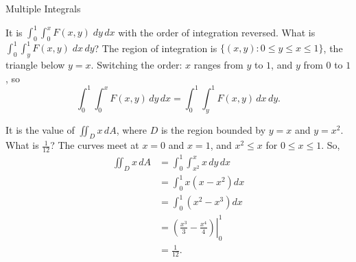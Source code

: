\documentclass{article}
\begin{document}
\begin{category}{Multiple Integrals}
  \begin{clue}[write]
    It is $\displaystyle \int_0^1 \int_0^x F(x,y) \; dy\, dx$ with the order of integration reversed.
  \response
    What is $\displaystyle \int_0^1 \int_y^1 F(x,y) \; dx\, dy$?
  \solution
    The region of integration is $\{(x,y)\colon 0\le y\le x\le 1\}$, the triangle below $y=x$.
    Switching the order: $x$ ranges from $y$ to $1$, and $y$ from $0$ to $1$, so
    \[
    \int_0^1\int_0^x F(x,y)\,dy\,dx=\int_0^1\int_y^1 F(x,y)\,dx\,dy.
    \]
  \end{clue}

  \begin{clue}[say]
    It is the value of $\displaystyle \iint_D x\,dA$, where $D$ is the region bounded by $y=x$ and $y=x^2$.
  \response
    What is $\frac{1}{12}$?
  \solution
    The curves meet at $x=0$ and $x=1$, and $x^2\le x$ for $0\le x\le 1$. So,
    \begin{align*}
    \iint_D x\,dA
    &=\int_0^1\int_{x^2}^{x}x\,dy\,dx \\
    &=\int_0^1 x\left(x-x^2\right)dx \\
    &=\int_0^1\left(x^2-x^3\right)dx \\
    &=\left.\left(\frac{x^3}{3}-\frac{x^4}{4}\right)\right|_0^1 \\
    &=\frac{1}{12}.
    \end{align*}
  \end{clue}

\end{category}
\end{document}
